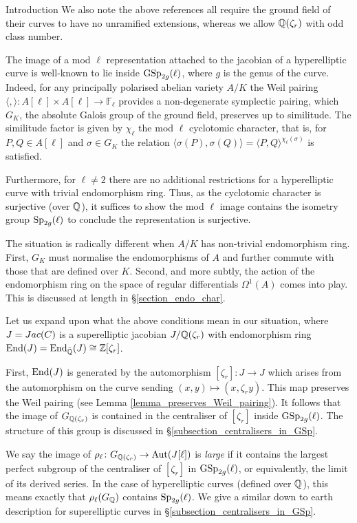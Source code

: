 \documentclass[11pt,a4paper]{article}
\newcommand{\Fl}{\mathbb{F}_\ell}
\newcommand{\Qr}{{\QQ(\zeta_r)}}
\newcommand{\Zr}{{\ZZ[\zeta_r]}}
\newcommand{\GQr}{G_{\QQ(\zeta_{r})}}
\newcommand{\zr}{\zeta_r}
\begin{document}
\begin{section}{Introduction}
We also note the above references all require the ground field of their curves to have no unramified extensions, whereas we allow $\Qr$ with odd class number.

The image of a mod $\ell$ representation attached to the jacobian of a hyperelliptic curve is well-known to lie inside $\GSp_{2g}(\ell)$, where $g$ is the genus of the curve.
Indeed, for any principally polarised abelian variety $A/K$ the Weil pairing $\langle,\rangle \colon A[\ell]\times A[\ell] \rightarrow \Fl$ provides a non-degenerate symplectic pairing, which $G_K$, the absolute Galois group of the ground field, preserves up to similitude.
The similitude factor is given by $\chi_\ell$ the mod $\ell$ cyclotomic character, that is, for $P,Q\in A[\ell]$ and $\sigma \in G_K$ the relation $\langle \sigma(P), \sigma(Q) \rangle = \langle P, Q \rangle^{\chi_\ell(\sigma)}$ is satisfied.

Furthermore, for $\ell \neq 2$ there are no additional restrictions for a hyperelliptic curve with trivial endomorphism ring.
Thus, as the cyclotomic character is surjective (over $\mathbb{Q}$), it suffices to show the mod $\ell$ image contains the isometry group $\Sp_{2g}(\ell)$ to conclude the representation is surjective.

The situation is radically different when $A/K$ has non-trivial endomorphism ring.
First, $G_K$ must normalise the endomorphisms of $A$ and further commute with those that are defined over $K$.
Second, and more subtly, the action of the endomorphism ring on the space of regular differentials $\Omega^1(A)$ comes into play.
This is discussed at length in \S \ref{section_endo_char}.

Let us expand upon what the above conditions mean in our situation, where $J={\rm Jac}(C)$ is a superelliptic jacobian $J/\Qr$ with endomorphism ring $\End(J) = \End_{\Bar{\QQ}}(J) \cong \Zr$.

First, $\End(J)$ is generated by the automorphism $[\zr]\colon J \rightarrow J$ which arises from the automorphism on the curve sending $(x,y) \mapsto (x,\zr y)$.
 This map preserves the Weil pairing (see Lemma \ref{lemma_preserves_Weil_pairing}).
It follows that the image of $\GQr$ is contained in the centraliser of $[\zr]$ inside $\GSp_{2g}(\ell)$.
The structure of this group is discussed in \S \ref{subsection_centralisers_in_GSp}.

We say the image of $\rho_\ell \colon \GQr \rightarrow \Aut(J[\ell])$ is \emph{large} if it  contains the largest perfect subgroup of the centraliser of $[\zr]$ in $\GSp_{2g}(\ell)$, or equivalently, the limit of its derived series.
In the case of hyperelliptic curves (defined over $\mathbb{Q}$), this means exactly that $\rho_\ell(G_{\mathbb{Q}})$ contains $\Sp_{2g}(\ell)$.
We give a similar down to earth description for superelliptic curves in \S \ref{subsection_centralisers_in_GSp}.


\end{section}
\end{document}
